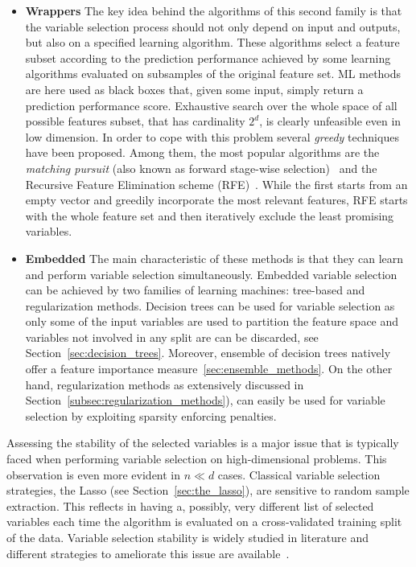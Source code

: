 \begin{itemize}
		\item[] \textbf{Wrappers}
		The key idea behind the algorithms of this second family is that the variable selection process should not only depend on input and outputs, but also on a specified learning algorithm. These algorithms select a feature subset according to the prediction performance achieved by some learning algorithms evaluated on subsamples of the original feature set. ML methods are here used as black boxes that, given some input, simply return a prediction performance score.
		Exhaustive search over the whole space of all possible features subset, that has cardinality $2^d$, is clearly unfeasible even in low dimension. In order to cope with this problem several \textit{greedy} techniques have been proposed. Among them, the most popular algorithms are the \textit{matching pursuit} (also known as forward stage-wise selection)~\cite{cai2011orthogonal} and the Recursive Feature Elimination scheme (RFE)~\cite{guyon2002gene}.
		While the first starts from an empty vector and greedily incorporate the most relevant features, RFE starts with the whole feature set and then iteratively exclude the least promising variables.
		
		\item[] \textbf{Embedded}
		The main characteristic of these methods is that they can learn and perform variable selection simultaneously.
		Embedded variable selection can be achieved by two families of learning machines: tree-based and regularization methods.
		Decision trees can be used for variable selection as only some of the input variables are used to partition the feature space and variables not involved in any split are can be discarded, see Section~\ref{sec:decision_trees}. Moreover, ensemble of decision trees natively offer a feature importance measure~\ref{sec:ensemble_methods}.
		On the other hand, regularization methods as extensively discussed in Section~\ref{subsec:regularization_methods}), can easily be used for variable selection by exploiting sparsity enforcing penalties.
		
	\end{itemize}

	Assessing the stability of the selected variables is a major issue that is typically faced when performing variable selection on high-dimensional problems. This observation is even more evident in $n \ll d$ cases. Classical variable selection strategies, \eg the Lasso (see Section~\ref{sec:the_lasso}), are sensitive to random sample extraction.
	This reflects in having a, possibly, very different list of selected variables each time the algorithm is evaluated on a cross-validated training split of the data.
	Variable selection stability is widely studied in literature and different strategies to ameliorate this issue are available~\cite{kuncheva2007stability, de2009elastic, hofner2015controlling, nogueira2016measuring}.
	
